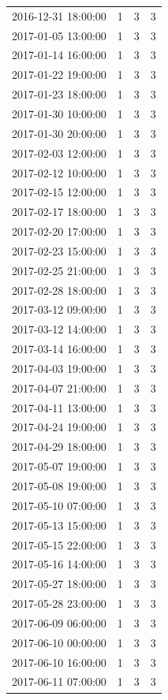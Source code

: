 \begin{tabular}{lrrr}
2016-12-31 18:00:00 & 1 & 3 & 3 \\
2017-01-05 13:00:00 & 1 & 3 & 3 \\
2017-01-14 16:00:00 & 1 & 3 & 3 \\
2017-01-22 19:00:00 & 1 & 3 & 3 \\
2017-01-23 18:00:00 & 1 & 3 & 3 \\
2017-01-30 10:00:00 & 1 & 3 & 3 \\
2017-01-30 20:00:00 & 1 & 3 & 3 \\
2017-02-03 12:00:00 & 1 & 3 & 3 \\
2017-02-12 10:00:00 & 1 & 3 & 3 \\
2017-02-15 12:00:00 & 1 & 3 & 3 \\
2017-02-17 18:00:00 & 1 & 3 & 3 \\
2017-02-20 17:00:00 & 1 & 3 & 3 \\
2017-02-23 15:00:00 & 1 & 3 & 3 \\
2017-02-25 21:00:00 & 1 & 3 & 3 \\
2017-02-28 18:00:00 & 1 & 3 & 3 \\
2017-03-12 09:00:00 & 1 & 3 & 3 \\
2017-03-12 14:00:00 & 1 & 3 & 3 \\
2017-03-14 16:00:00 & 1 & 3 & 3 \\
2017-04-03 19:00:00 & 1 & 3 & 3 \\
2017-04-07 21:00:00 & 1 & 3 & 3 \\
2017-04-11 13:00:00 & 1 & 3 & 3 \\
2017-04-24 19:00:00 & 1 & 3 & 3 \\
2017-04-29 18:00:00 & 1 & 3 & 3 \\
2017-05-07 19:00:00 & 1 & 3 & 3 \\
2017-05-08 19:00:00 & 1 & 3 & 3 \\
2017-05-10 07:00:00 & 1 & 3 & 3 \\
2017-05-13 15:00:00 & 1 & 3 & 3 \\
2017-05-15 22:00:00 & 1 & 3 & 3 \\
2017-05-16 14:00:00 & 1 & 3 & 3 \\
2017-05-27 18:00:00 & 1 & 3 & 3 \\
2017-05-28 23:00:00 & 1 & 3 & 3 \\
2017-06-09 06:00:00 & 1 & 3 & 3 \\
2017-06-10 00:00:00 & 1 & 3 & 3 \\
2017-06-10 16:00:00 & 1 & 3 & 3 \\
2017-06-11 07:00:00 & 1 & 3 & 3 \\

\end{tabular}
